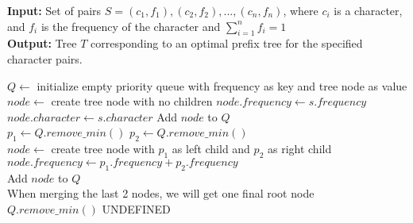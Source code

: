 \documentclass[12pt,a4paper]{article}
\begin{document}
	\begin{algorithm}
		\textbf{Input:} Set of pairs $ S = {(c_1, f_1), (c_2, f_2), ..., (c_n, f_n)} $, where $ c_i $ is a character, and $ f_i $ is the frequency of the character and $ \sum_{i=1}^{n}{f_i} = 1 $
		\\\textbf{Output:} Tree $ T $ corresponding to an optimal prefix tree for the specified character pairs.
		\begin{algorithmic}
				\State $ Q \gets $ initialize empty priority queue with frequency as key and tree node as value
				\\
					\State $ node \gets $ create tree node with no children
					\State $ node.frequency \gets s.frequency $
					\State $ node.character \gets s.character $
					\State Add $ node $ to $ Q $
				\EndFor
				\\
					\State $ p_1 \gets Q.remove\_min() $
					\State $ p_2 \gets Q.remove\_min() $
					\\
					\State $ node \gets $ create tree node with $ p_1 $ as left child and $ p_2 $ as right child
					\State $ node.frequency \gets p_1.frequency + p_2.frequency $
					\\
					\State Add $ node $ to $ Q $
				\EndWhile
				\\
				 \Comment When merging the last 2 nodes, we will get one final root node
					\State \Return $ Q.remove\_min() $
				\Else
					\State \Return UNDEFINED
				\EndIf
			\EndProcedure
		\end{algorithmic}
	\end{algorithm}
\end{document}
